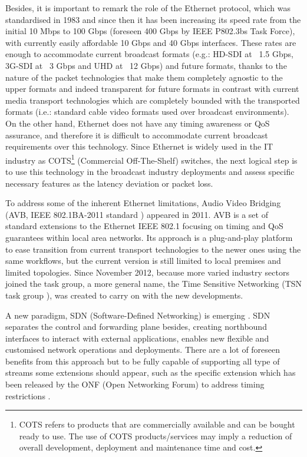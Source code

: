 Besides, it is important to remark the role of the Ethernet \cite{eth} protocol, which was standardised in 1983 and since then it has been increasing its speed rate from the initial 10 Mbps to 100 Gbps (foreseen 400 Gbps by IEEE P802.3bs \cite{ethbs} Task Force), with currently easily affordable 10 Gbps and 40 Gbps interfaces. These rates are enough to accommodate current broadcast formats (e.g.: HD-SDI at ~1.5 Gbps, 3G-SDI at ~3 Gbps and UHD at ~12 Gbps) and future formats, thanks to the nature of the packet technologies that make them completely agnostic to the upper formats and indeed transparent for future formats in contrast with current media transport technologies which are completely bounded with the transported formats (i.e.: standard cable video formats used over broadcast environments). On the other hand, Ethernet does not have any timing awareness or QoS assurance, and therefore it is difficult to accommodate current broadcast requirements over this technology. Since Ethernet is widely used in the IT industry as COTS\footnote{COTS refers to products that are commercially available and can be bought ready to use. The use of COTS products/services may imply a reduction of overall development, deployment and maintenance time and cost.} (Commercial Off-The-Shelf) switches, the next logical step is to use this technology in the broadcast industry deployments and assess specific necessary features as the latency deviation or packet loss.

To address some of the inherent Ethernet limitations, Audio Video Bridging (AVB, IEEE 802.1BA-2011 standard \cite{avb}) appeared in 2011. AVB is a set of standard extensions to the Ethernet IEEE 802.1 \cite{8021} focusing on timing and QoS guarantees within local area networks. Its approach is a plug-and-play platform to ease transition from current transport technologies to the newer ones using the same workflows, but the current version is still limited to local premises and limited topologies. Since November 2012, because more varied industry sectors joined the task group, a more general name, the Time Sensitive Networking (TSN task group \cite{tsn}), was created to carry on with the new developments.

A new paradigm, SDN (Software-Defined Networking) is emerging \cite{sdn}. SDN separates the control and forwarding plane besides, creating northbound interfaces to interact with external applications, enables new flexible and customised network operations and deployments. There are a lot of foreseen benefits from this approach but to be fully capable of supporting all type of streams some extensions should appear, such as the specific extension which has been released by the ONF (Open Networking Forum) to address timing restrictions \cite{sdn}.

